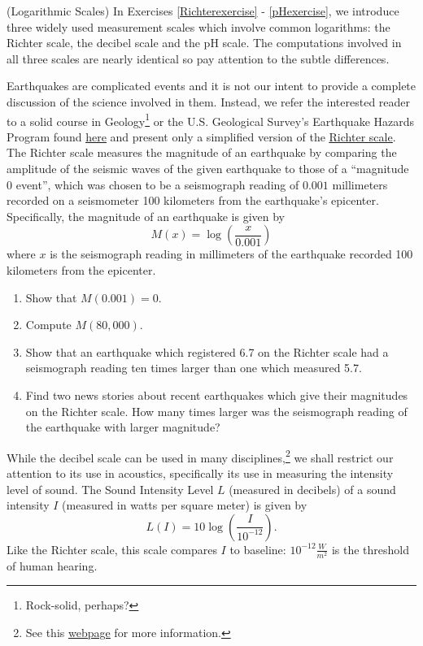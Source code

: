 \documentclass{ximera}
\begin{document}
\begin{question}\label{logarithmicscales}
(Logarithmic Scales) In Exercises \ref{Richterexercise} - \ref{pHexercise}, we introduce three widely used measurement scales which involve common logarithms: the Richter scale, the decibel scale and the pH scale.  The computations involved in all three scales are nearly identical so pay attention to the subtle differences.

\begin{problem}\label{Richterexercise} 
Earthquakes are complicated events and it is not our intent to provide a complete discussion of the science involved in them.  Instead, we refer the interested reader to a solid course in Geology\footnote{Rock-solid, perhaps?} or the U.S. Geological Survey's Earthquake Hazards Program found \href{http://earthquake.usgs.gov/}{\underline{here}} and present only a simplified version of the \href{http://en.wikipedia.org/wiki/Richter_scale}{\underline{Richter scale}}.  The Richter scale measures the magnitude of an earthquake by comparing the amplitude of the seismic waves of the given earthquake to those of a ``magnitude 0 event'', which was chosen to be a seismograph reading of $0.001$ millimeters recorded on a seismometer 100 kilometers from the earthquake's epicenter.  Specifically, the magnitude of an earthquake is given by \[M(x) = \log \left(\dfrac{x}{0.001}\right)\] where $x$ is the seismograph reading in millimeters of the earthquake recorded 100 kilometers from the epicenter.  

\begin{enumerate}

\item Show that $M(0.001) = 0$.
\item Compute $M(80,000)$.
\item Show that an earthquake which registered 6.7 on the Richter scale had a seismograph reading ten times larger than one which measured 5.7.
\item Find two news stories about recent earthquakes which give their magnitudes on the Richter scale.  How many times larger was the seismograph reading of the earthquake with larger magnitude?

\end{enumerate}

\end{problem}

\begin{problem}\label{decibelexercise}
While the decibel scale can be used in many disciplines,\footnote{See this  \href{http://en.wikipedia.org/wiki/Decibel}{\underline{webpage}} for more information.} we shall restrict our attention to its use in acoustics, specifically its use in measuring the intensity level of sound. The Sound Intensity Level $L$ (measured in decibels) of a sound intensity $I$ (measured in watts per square meter) is given by \[L(I) = 10\log\left( \dfrac{I}{10^{-12}} \right).\] Like the Richter scale, this scale compares $I$ to baseline: $10^{-12} \frac{W}{m^{2}}$ is the threshold of human hearing. 


\end{problem}
\end{question}
\end{document}

